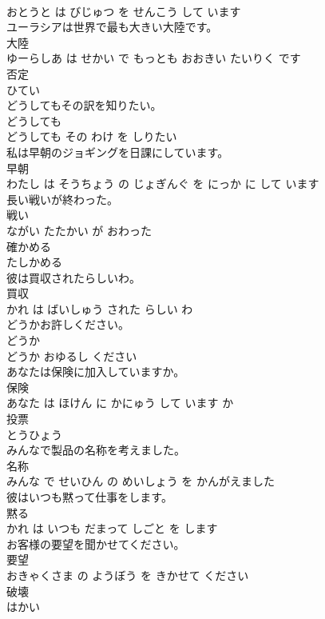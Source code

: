 \documentclass[8pt]{extreport}
\begin{document}
\begin{CJK}{UTF8}{min}
\\	おとうと は びじゅつ を せんこう して います			
\\	ユーラシアは世界で最も大きい大陸です。	
\\	大陸 
\\	ゆーらしあ は せかい で もっとも おおきい たいりく です			
\\	否定	
\\	ひてい		
\\	どうしてもその訳を知りたい。	
\\	どうしても 
\\	どうしても その わけ を しりたい			
\\	私は早朝のジョギングを日課にしています。	
\\	早朝 
\\	わたし は そうちょう の じょぎんぐ を にっか に して います			
\\	長い戦いが終わった。	
\\	戦い 
\\	ながい たたかい が おわった			
\\	確かめる	
\\	たしかめる		
\\	彼は買収されたらしいわ。	
\\	買収 
\\	かれ は ばいしゅう された らしい わ			
\\	どうかお許しください。	
\\	どうか 
\\	どうか おゆるし ください			
\\	あなたは保険に加入していますか。	
\\	保険 
\\	あなた は ほけん に かにゅう して います か			
\\	投票	
\\	とうひょう		
\\	みんなで製品の名称を考えました。	
\\	名称 
\\	みんな で せいひん の めいしょう を かんがえました			
\\	彼はいつも黙って仕事をします。	
\\	黙る 
\\	かれ は いつも だまって しごと を します			
\\	お客様の要望を聞かせてください。	
\\	要望 
\\	おきゃくさま の ようぼう を きかせて ください			
\\	破壊	
\\	はかい		

\end{CJK}
\end{document}
